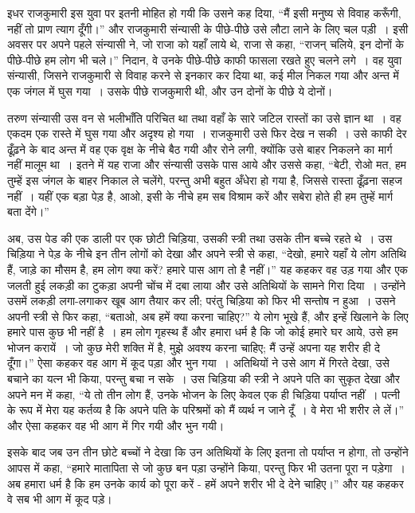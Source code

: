 इधर राजकुमारी इस युवा पर इतनी मोहित हो गयी कि उसने कह दिया, “मैं इसी मनुष्य से विवाह करूँगी, नहीं तो प्राण त्याग दूँगी।” और राजकुमारी संन्यासी के पीछे-पीछे उसे लौटा लाने के लिए चल पड़ी~। इसी अवसर पर अपने पहले संन्यासी ने, जो राजा को यहाँ लाये थे, राजा से कहा, “राजन् चलिये, इन दोनों के पीछे-पीछे हम लोग भी चले।” निदान, वे उनके पीछे-पीछे काफी फासला रखते हुए चलने लगे~। वह युवा संन्यासी, जिसने राजकुमारी से विवाह करने से इनकार कर दिया था, कई मील निकल गया और अन्त में एक जंगल में घुस गया~। उसके पीछे राजकुमारी थी, और उन दोनों के पीछे ये दोनों।

तरुण संन्यासी उस वन से भलीभाँति परिचित था तथा वहाँ के सारे जटिल रास्तों का उसे ज्ञान था~। वह एकदम एक रास्ते में घुस गया और अदृश्य हो गया~। राजकुमारी उसे फिर देख न सकी~। उसे काफी देर ढूँढ़ने के बाद अन्त में वह एक वृक्ष के नीचे बैठ गयी और रोने लगी, क्योंकि उसे बाहर निकलने का मार्ग नहीं मालूम था~। इतने में यह राजा और संन्यासी उसके पास आये और उससे कहा, “बेटी, रोओ मत, हम तुम्हें इस जंगल के बाहर निकाल ले चलेंगे, परन्तु अभी बहुत अँधेरा हो गया है, जिससे रास्ता ढूँढ़ना सहज नहीं~। यहीं एक बड़ा पेड़ है, आओ, इसी के नीचे हम सब विश्राम करें और सबेरा होते ही हम तुम्हें मार्ग बता देंगे।”

अब, उस पेड की एक डाली पर एक छोटी चिड़िया, उसकी स्त्री तथा उसके तीन बच्चे रहते थे~। उस चिड़िया ने पेड़ के नीचे इन तीन लोगों को देखा और अपने स्त्री से कहा, “देखो, हमारे यहाँ ये लोग अतिथि हैं, जाड़े का मौसम है, हम लोग क्या करें? हमारे पास आग तो है नहीं।” यह कहकर वह उड़ गया और एक जलती हुई लकड़ी का टुकड़ा अपनी चोंच में दबा लाया और उसे अतिथियों के सामने गिरा दिया~। उन्होंने उसमें लकड़ी लगा-लगाकर खूब आग तैयार कर ली; परंतु चिड़िया को फिर भी सन्तोष न हुआ~। उसने अपनी स्त्री से फिर कहा, “बताओ, अब हमें क्या करना चाहिए?” ये लोग भूखे हैं, और इन्हें खिलाने के लिए हमारे पास कुछ भी नहीं है~। हम लोग गृहस्थ हैं और हमारा धर्म है कि जो कोई हमारे घर आये, उसे हम भोजन करायें~। जो कुछ मेरी शक्ति में है, मुझे अवश्य करना चाहिए; मैं उन्हें अपना यह शरीर ही दे दूँगा।” ऐसा कहकर वह आग में कूद पड़ा और भुन गया~। अतिथियों ने उसे आग में गिरते देखा, उसे बचाने का यत्न भी किया, परन्तु बचा न सके~। उस चिड़िया की स्त्री ने अपने पति का सुकृत देखा और अपने मन में कहा, “ये तो तीन लोग हैं, उनके भोजन के लिए केवल एक ही चिड़िया पर्याप्त नहीं~। पत्नी के रूप में मेरा यह कर्तव्य है कि अपने पति के परिश्रमों को मैं व्यर्थ न जाने दूँ~। वे मेरा भी शरीर ले लें।” और ऐसा कहकर वह भी आग में गिर गयी और भुन गयी।

इसके बाद जब उन तीन छोटे बच्चों ने देखा कि उन अतिथियों के लिए इतना तो पर्याप्त न होगा, तो उन्होंने आपस में कहा, “हमारे मातापिता से जो कुछ बन पड़ा उन्होंने किया, परन्तु फिर भी उतना पूरा न पड़ेगा~। अब हमारा धर्म है कि हम उनके कार्य को पूरा करें - हमें अपने शरीर भी दे देने चाहिए।” और यह कहकर वे सब भी आग में कूद पड़े।

